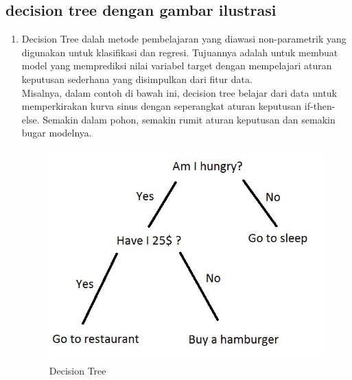 \subsection{decision tree dengan gambar ilustrasi}
\begin{enumerate}
\item Decision Tree dalah metode pembelajaran yang diawasi non-parametrik yang digunakan untuk klasifikasi dan regresi. Tujuannya adalah untuk membuat model yang memprediksi nilai variabel target dengan mempelajari aturan keputusan sederhana yang disimpulkan dari fitur data.\\
Misalnya, dalam contoh di bawah ini, decision tree belajar dari data untuk memperkirakan kurva sinus dengan seperangkat aturan keputusan if-then-else. Semakin dalam pohon, semakin rumit aturan keputusan dan semakin bugar modelnya.
\begin{figure}[ht]
\centering
\includegraphics[scale=0.5]{figures/andi/tree.jpg}
\caption{Decision Tree}
\label{contoh}
\end{figure}
\end{enumerate}

